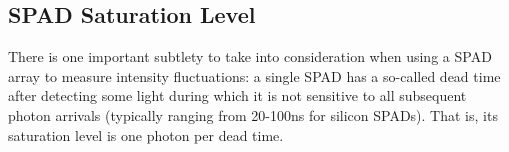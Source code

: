 \documentclass[]{article}
\begin{document}
\subsection{SPAD Saturation Level}
	There is one important subtlety to take into consideration when using a SPAD array to measure intensity fluctuations: a single SPAD has a so-called dead time after detecting some light during which it is not sensitive to all subsequent photon arrivals (typically ranging from 20-100ns for silicon SPADs). That is, its saturation level is one photon per dead time.
	


\end{document}
